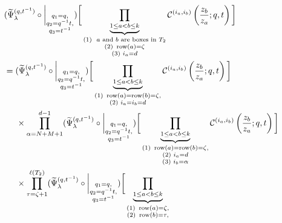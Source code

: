 \documentclass[12pt,reqno,a4paper]{amsart}
\newcommand{\comp}{\circ}
\newcommand{\cals}[1]{\mathcal{#1}}
\numberwithin{equation}{section}
\theoremstyle{definition}
\begin{document}
\footnotesize
\begin{align}
&(
\widetilde{\Psi}_{\lambda}^{(q,t^{-1})}
\comp 
\bigg|_{
	\substack{
		q_1 = q, \\
		q_2 = q^{-1}t,\\
		q_3 = t^{-1} \\
	}
}
)
\bigg[
\underbrace{	\prod_{1 \leq a < b \leq k}				}_{
	\substack{
		(1) \,\, \text{ $a$ and $b$ are boxes in $T_2$}
		\\
		(2) \,\, \operatorname{row}(a) = \zeta
		\\
		(3) \,\, i_a = d 
	}	
}
\cals{C}^{(i_a,i_b)}\left(
\frac{z_b}{z_a}
; q, t
\right)
\bigg]
\label{eqn313-1501-1aug}
\\
&= 
(
\widetilde{\Psi}_{\lambda}^{(q,t^{-1})}
\comp 
\bigg|_{
	\substack{
		q_1 = q, \\
		q_2 = q^{-1}t,\\
		q_3 = t^{-1} \\
	}
}
)
\bigg[
\underbrace{	\prod_{1 \leq a < b \leq k}				}_{
	\substack{
		(1) \,\, \operatorname{row}(a) = \operatorname{row}(b) = \zeta, 
		\\
		(2) \,\, i_a = i_b = d
	}	
}
\cals{C}^{(i_a,i_b)}\left(
\frac{z_b}{z_a}
; q, t
\right)
\bigg]
\notag 
\\
&\hspace{0.5cm}\times 
\prod_{\alpha = N+M+1}^{d - 1} 
(
\widetilde{\Psi}_{\lambda}^{(q,t^{-1})}
\comp 
\bigg|_{
	\substack{
		q_1 = q, \\
		q_2 = q^{-1}t,\\
		q_3 = t^{-1} \\
	}
}
)
\bigg[
\underbrace{	\prod_{1 \leq a < b \leq k}				}_{
	\substack{
		(1) \,\, \operatorname{row}(a) = \operatorname{row}(b) = \zeta, 
		\\
		(2) \,\, i_a =  d
		\\
		(3) \,\, i_b = \alpha
	}	
}
\cals{C}^{(i_a,i_b)}\left(
\frac{z_b}{z_a}
; q, t
\right)
\bigg]
\notag 
\\
&\hspace{0.5cm}\times 
\prod_{\tau = \zeta + 1}^{\ell(T_2)} 
(
\widetilde{\Psi}_{\lambda}^{(q,t^{-1})}
\comp 
\bigg|_{
	\substack{
		q_1 = q, \\
		q_2 = q^{-1}t,\\
		q_3 = t^{-1} \\
	}
}
)
\bigg[
\underbrace{	\prod_{1 \leq a < b \leq k}				}_{
	\substack{
		(1) \,\, \operatorname{row}(a) = \zeta, 
		\\
		(2) \,\,  \operatorname{row}(b) = \tau, 
		\\
}}
\end{align}
\end{document}
